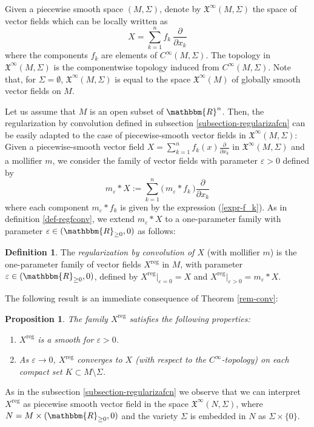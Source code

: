 \documentclass[11pt,psamsfonts]{article}
\newtheorem{Proposition}[Theorem]{Proposition}
\theoremstyle{definition}
\newtheorem{Definition}[Theorem]{Definition}
\theoremstyle{remark}
\newcommand{\cR}{\ensuremath{\mathbbm{R}}}
\newcommand{\eps}{\varepsilon }
\newcommand{\vf}{f}
\newcommand{\reg}{\mathrm{reg}}
\begin{document}
Given a piecewise smooth space $(M,\Sigma)$,  denote by $\mathfrak{X }^{\infty} (M, \Sigma)$ the space of vector fields
which can be locally written as
$$
X = \sum_{k = 1}^n \vf_k \ \frac{\partial}{\partial x_k}
$$
where the components $\vf_k$ are elements of $C^{\infty} (M, \Sigma)$. The topology in
$\mathfrak{X }^{\infty} (M, \Sigma)$ is the componentwise topology induced
from $C^{\infty} (M, \Sigma)$. Note that, for $\Sigma = \emptyset$,
$\mathfrak{X }^{\infty} (M, \Sigma)$ is equal to the space $\mathfrak{X }^{\infty} (M)$ of globally smooth vector fields on $M$.

Let us assume that $M$ is an open subset of $\cR^n$. Then, the regularization by convolution defined in subsection \ref{subsection-regularizafcn} can be easily adapted to the case of piecewise-smooth vector fields in $\mathfrak{X }^{\infty} (M,\Sigma)$: Given a piecewise-smooth vector field $X = \sum_{k = 1}^n \vf_k (x)
\frac{\partial}{\partial x_k}$ in $\mathfrak{X }^{\infty} (M, \Sigma)$ and a mollifier $m$, we consider the family of vector fields with parameter $\eps >0$ defined by
\begin{equation}\label{reg-conv-X}
m_\eps \ast X := \sum_{k = 1}^n \big(\, m_\eps \ast \vf_k\, \big) 
   \frac{\partial}{\partial x_k} 
\end{equation}
where each component $m_\eps \ast \vf_k$ is given by the expression (\ref{expr-f_k}).
As in definition \ref{def-regfconv}, we extend $m_\eps \ast X$ to a one-parameter family with parameter $\eps \in (\cR_{\ge 0},0)$ as follows:
\begin{Definition}\label{def-regularized-family}
The {\em regularization by
convolution of $X$} (with mollifier $m$) is the one-parameter family of vector fields $X^\reg$ in $M$, with parameter $\eps \in  (\cR_{\ge 0},0)$, defined by 
$X^\reg |_{\eps =0} =X$ and $X^\reg |_{\eps > 0} = m_\eps \ast X$. 
\end{Definition}
The following result is an immediate consequence of Theorem \ref{rem-conv}:
\begin{Proposition}
The family $X^\reg$ satisfies the following properties:
\begin{enumerate}
\item $X^\reg$ is a smooth for $\eps >0$.
\item As $\eps \rightarrow 0$, $X^\reg$ converges to $X$ (with respect to the $C^\infty$-topology) on each compact set $K \subset M\setminus\Sigma$.
\end{enumerate}
\end{Proposition}
As in the subsection \ref{subsection-regularizafcn} we observe that we can interpret $X^\reg$ as piecewise smooth vector field in the space
$\mathfrak{X}^{\infty} (N, \Sigma)$, where 
$N=M\times (\cR_{\ge 0},0)$ and the variety $\Sigma$ is embedded in $N$ as $\Sigma \times \{0\}$. 
\end{document}
